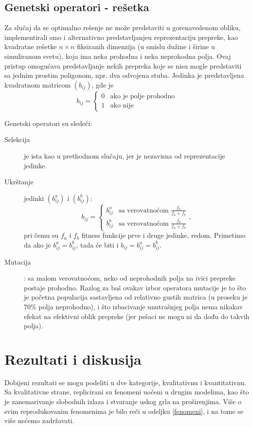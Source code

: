 \documentclass[12pt]{article}
\begin{document}
\subsection{Genetski operatori - rešetka}

Za slučaj da se optimalno rešenje ne može predstaviti u gorenavedenom obliku, implementirali smo i alternativno predstavljanjeu reprezentaciju prepreke, kao kvadratne rešetke $n\times n$ fiksiranih dimenzija (u smislu dužine i širine u simuliranom svetu), koja ima neka prohodna i neka neprohodna polja. Ovaj pristup omogućava predstavljanje nekih prepreka koje se nisu mogle predstaviti sa jednim prostim poligonom, npr. dva odvojena stuba. Jedinka je predstavljena kvadratnom matricom $(b_{ij})$, gde je
$$
b_{ij} = 
\begin{cases}
    0 & \text{ako je polje prohodno}\\
    1 & \text{ako nije}
\end{cases}
$$

Genetski operatori su sledeći:
\begin{description}
\item[Selekcija] je ista kao u prethodnom slučaju, jer je nezavisna od reprezentacije jedinke.
\item[Ukrštanje] jedinki $(b^a_{ij})$ i $(b^b_{ij})$:
$$
b_{ij} = 
\begin{cases}
    b^a_{ij} & \text{sa verovatnoćom } \frac{f_a}{f_a+f_b}\\
    b^b_{ij} & \text{sa verovatnoćom } \frac{f_b}{f_a+f_b}
\end{cases},
$$
pri čemu su $f_a$ i $f_b$ fitness funkcije prve i druge jedinke, redom. Primetimo da ako je $ b^a_{ij} = b^b_{ij}$, tada će biti i $b_{ij} = b^a_{ij} = b^b_{ij}$.
\item[Mutacija]: sa malom verovatnoćom, neko od neprohodnih polja na ivici prepreke postaje prohodno. Razlog za baš ovakav izbor operatora mutacije je to što je početna populacija sastavljena od relativno gustih matrica (u proseku je $70\%$ polja neprohodno), i što izbacivanje unutrašnjeg polja nema nikakav efekat na efektivni oblik prepreke (jer pešaci ne mogu ni da dođu do takvih polja).
\end{description}

\section{Rezultati i diskusija}

Dobijeni rezultati se mogu podeliti u dve kategorije, kvalitativnu i kvantitativnu. Sa kvalitativne strane, replicirani su fenomeni uočeni u drugim modelima, kao što je zanemarivanje slobodnih izlaza i stvaranje uskog grla na proširenjima. Više o svim reprodukovanim fenomenima je bilo reči u odeljku \ref{fenomeni}, i na tome se više nećemo zadržavati.
\end{document}
